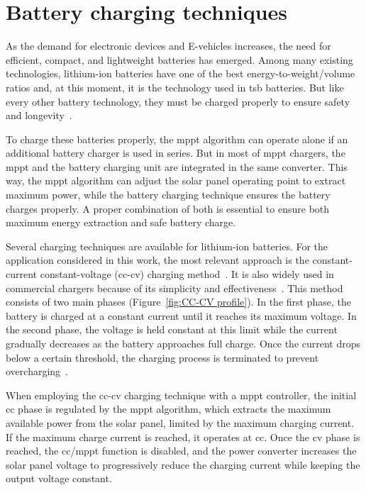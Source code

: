     
\section{Battery charging techniques}

    As the demand for electronic devices and E-vehicles increases, the need for efficient, compact, and lightweight batteries has emerged. Among many existing technologies, lithium-ion batteries have one of the best energy-to-weight/volume ratios and, at this moment, it is the technology used in \ac{tsb} batteries. But like every other battery technology, they must be charged properly to ensure safety and longevity~\cite{Charging_Algorithms_Lithium_Ion_Batteries_Overview_2012}.

    To charge these batteries properly, the \ac{mppt} algorithm can operate alone if an additional battery charger is used in series. But in most of \ac{mppt} chargers, the \ac{mppt} and the battery charging unit are integrated in the same converter. This way, the \ac{mppt} algorithm can adjust the solar panel operating point to extract maximum power, while the battery charging technique ensures the battery charges properly. A proper combination of both is essential to ensure both maximum energy extraction and safe battery charge.

    Several charging techniques are available for lithium-ion batteries. For the application considered in this work, the most relevant approach is the constant-current constant-voltage (\acs{cc}-\acs{cv}) charging method~\cite{Charging_Algorithms_Nickel_Lithium_Battery_2011}. It is also widely used in commercial chargers because of its simplicity and effectiveness~\cite{Review_Different_Charging_Techniques_Lithium_Polymer_Battery_2015}. 
    This method consists of two main phases (Figure~\ref{fig:CC-CV profile}). In the first phase, the battery is charged at a constant current until it reaches its maximum voltage. In the second phase, the voltage is held constant at this limit while the current gradually decreases as the battery approaches full charge. Once the current drops below a certain threshold, the charging process is terminated to prevent overcharging~\cite{Review_Different_Charging_Techniques_Lithium_Polymer_Battery_2015}.

    When employing the \acs{cc}-\acs{cv} charging technique with a \ac{mppt} controller, the initial \ac{cc} phase is regulated by the \ac{mppt} algorithm, which extracts the maximum available power from the solar panel, limited by the maximum charging current. If the maximum charge current is reached, it operates at \ac{cc}. Once the \ac{cv} phase is reached, the \ac{cc}/\ac{mppt} function is disabled, and the power converter increases the solar panel voltage to progressively reduce the charging current while keeping the output voltage constant.


